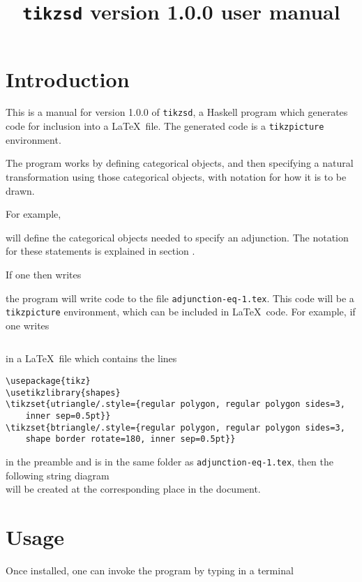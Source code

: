 \documentclass{amsart}
\newcommand{\vlength}{0.2cm}
\begin{document}
\title{\texttt{tikzsd} version 1.0.0 user manual}
\maketitle
\tableofcontents
\section{Introduction}
    This is a manual for version 1.0.0 of \texttt{tikzsd}, a Haskell program
        which generates code for inclusion into a \LaTeX \ file.
    The generated code is a \texttt{tikzpicture} environment.

    The program works by defining categorical objects, and then specifying
        a natural transformation using those categorical objects, with notation
        for how it is to be drawn.

    For example,
    
    will define the categorical objects needed to specify an adjunction.
    The notation for these statements is explained in section .

    If one then writes
    
    the program will write code to the file \texttt{adjunction-eq-1.tex}.
    This code will be a \texttt{tikzpicture} environment,
        which can be included in \LaTeX\ code.
    For example, if one writes

\vspace{\vlength}
\begin{verbatim}

\end{verbatim}
\vspace{\vlength}
in a \LaTeX \ file which contains the lines

\vspace{\vlength}
\begin{verbatim}
\usepackage{tikz}
\usetikzlibrary{shapes}
\tikzset{utriangle/.style={regular polygon, regular polygon sides=3,
    inner sep=0.5pt}}
\tikzset{btriangle/.style={regular polygon, regular polygon sides=3,
    shape border rotate=180, inner sep=0.5pt}}
\end{verbatim}
\vspace{\vlength}
    in the preamble
    and is in the same folder as \texttt{adjunction-eq-1.tex},
    then the following string diagram
\[
    
\]
will be created at the corresponding place in the document.
\section{Usage}
Once installed, one can invoke the program by typing in a terminal
\end{document}

